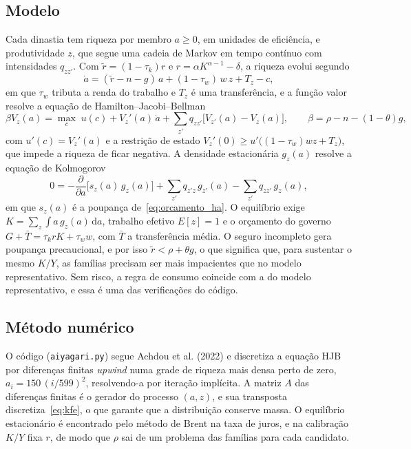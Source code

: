 \documentclass[11pt,a4paper]{article}
\newcommand{\dd}{\,\mathrm{d}}
\begin{document}
\subsection{Modelo}
Cada dinastia tem riqueza por membro $a\ge0$, em unidades de eficiência, e
produtividade $z$, que segue uma cadeia de Markov em tempo contínuo com
intensidades $q_{zz'}$. Com $\tilde r=(1-\tau_k)r$ e $r=\alpha K^{\alpha-1}-\delta$,
a riqueza evolui segundo
\begin{equation}
 \dot a=(\tilde r-n-g)\,a+(1-\tau_w)\,w\,z+T_z-c,
 \label{eq:orcamento_ha}
\end{equation}
em que $\tau_w$ tributa a renda do trabalho e $T_z$ é uma transferência, e a
função valor resolve a equação de Hamilton--Jacobi--Bellman
\begin{equation}
 \beta V_z(a)=\max_c\;u(c)+V_z'(a)\,\dot a+\sum_{z'}q_{zz'}\bigl[V_{z'}(a)-V_z(a)\bigr],
 \qquad \beta=\rho-n-(1-\theta)g,
 \label{eq:hjb}
\end{equation}
com $u'(c)=V_z'(a)$ e a restrição de estado
$V_z'(0)\ge u'\bigl((1-\tau_w)wz+T_z\bigr)$, que impede a riqueza de ficar
negativa. A densidade estacionária $g_z(a)$ resolve a equação de Kolmogorov
\begin{equation}
 0=-\frac{\partial}{\partial a}\bigl[s_z(a)\,g_z(a)\bigr]+\sum_{z'}q_{z'z}\,g_{z'}(a)-\sum_{z'}q_{zz'}\,g_z(a),
 \label{eq:kfe}
\end{equation}
em que $s_z(a)$ é a poupança de~\eqref{eq:orcamento_ha}. O equilíbrio exige
$K=\sum_z\int a\,g_z(a)\dd a$, trabalho efetivo $E[z]=1$ e o orçamento do
governo $G+\bar T=\tau_k rK+\tau_w w$, com $\bar T$ a transferência média. O
seguro incompleto gera poupança precaucional, e por isso $\tilde r<\rho+\theta g$,
o que significa que, para sustentar o mesmo $K/Y$, as famílias precisam ser
mais impacientes que no modelo representativo. Sem risco, a regra de consumo
coincide com a do modelo representativo, e essa é uma das verificações do
código.

\subsection{Método numérico}
O código (\texttt{aiyagari.py}) segue Achdou et al. (2022) e discretiza a
equação HJB por diferenças finitas \emph{upwind} numa grade de riqueza mais
densa perto de zero, $a_i=150\,(i/599)^2$, resolvendo-a por iteração
implícita. A matriz $A$ das diferenças finitas é o gerador do processo
$(a,z)$, e sua transposta discretiza~\eqref{eq:kfe}, o que garante que a
distribuição conserve massa. O equilíbrio estacionário é encontrado pelo
método de Brent na taxa de juros, e na calibração $K/Y$ fixa $r$, de modo que
$\rho$ sai de um problema das famílias para cada candidato.
\end{document}
